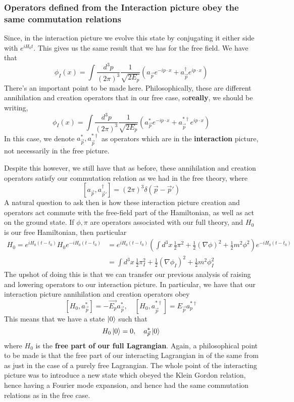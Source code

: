 \subsubsection{Operators defined from the Interaction picture obey the same commutation relations} 
Since, in the interaction picture we evolve this 
state by conjugating it either side with $ e^{ i  H_0 t }$. 
This gives us the same result that we 
has for the free field. We have that 
\[
\phi_ I ( x) = \int \frac{ d^ 3 p }{ ( 2 \pi ) ^3 } \frac{ 1 }{ \sqrt{ 2 E_p }  } (a_{ \vec{p}}  e^{  - i p \cdot  x } + a_{ \vec{p} }^\dagger e^{ i p \cdot  x } )  
\] There's an important point to be made here. 
Philosophically, these are different annihilation and 
creation operators that in our free case, so\textbf{really}, 
we should be writing, 
\[
\phi_ I ( x) = \int \frac{ d^ 3 p }{ ( 2 \pi ) ^3 } \frac{ 1 }{ \sqrt{ 2 E_p }  } (a_{ \vec{p}}^*  e^{  - i p \cdot  x } + a_{ \vec{p} }^{* \dagger}  e^{ i p \cdot  x } )  
\]
In this case, we denote $ a_{ \vec{p}}^ * , a_{\vec{p}}^ { * \dagger }  $ as 
operators which are in the \textbf{interaction} picture, 
not necessarily in the free picture. 

Despite this however, we still have that 
as before, these annihilation and 
creation operators satisfy our commutation relation as we had in 
the free theory, where 
\[
[ a_{ \vec{p} } , a_{ \vec{p}' } ^ \dagger ] = ( 2 \pi ) ^ 3 \delta ( \vec{p}- \vec{p}' ) 
\] 
A natural question to ask then is how these interaction picture
creation and operators act commute with the free-field part of the Hamiltonian, 
as well as act on the ground state. If $\phi , \pi $ are operators
associated with our full theory, and $ H_0 $ is our free Hamiltonian, 
then particular 
\begin{align*}
H_0 = e^{ i H_0 ( t - t_0) } H_0 e ^{  - iH_0 ( t - t_0) } &=   e^{ i H_0 ( t - t_0) } \left( \int d^ 3 x \, \frac{1}{2} \pi ^ 2 + \frac{1}{2 } ( \nabla  \phi ) ^ 2 + \frac{1}{2 } m ^ 2 \phi ^ 2  \right)   e ^{  - iH_0 ( t - t_0) } \\
				    &=  \int d^ 3 x \,  \frac{1}{2 } \pi_I ^ 2 +  \frac{1}{2 }( \nabla \phi_I ) ^ 2  + \frac{1}{2 } m^ 2 \phi_I ^ 2  
\end{align*}
The upshot of doing this is that we can transfer our previous analysis of raising and
lowering operators to our interaction picture. In particular, 
we have that our interaction picture annihilation and creation operators obey 
\[
[ H_0 , a_{ \vec{p} } ^ * ] = - \vec{E_p} a_{ \vec{p} }^ * , \quad [ H_0 , a_{ \vec{p} }^{ * \dagger } ] = E_{\vec{p} } a_{p } ^{ * \dagger}
\] This means that we have a state $ \ket{ 0 }  $ such that 
\[
H_0 \ket{ 0 } = 0, \quad a_{ \vec{p} }^ * \ket{ 0 } 
\] where $ H_0 $ is the \textbf{free part of our full Lagrangian}. 
Again, a philosophical point to be made is that the free part of our 
interacting Lagrangian in of the same from as just in the case of a purely free Lagrangian. 
The whole point of the interacting picture was to introduce a new state
which obeyed the Klein Gordon relation, hence having a Fourier mode expansion, 
and hence had the same commutation relations as in the free case. 

